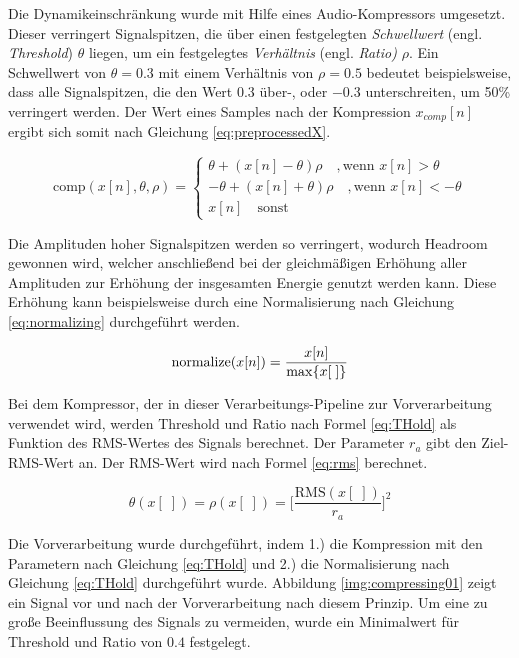 Die Dynamikeinschränkung wurde mit Hilfe eines Audio-Kompressors umgesetzt. Dieser verringert Signalspitzen, die über einen festgelegten \emph{Schwellwert} (engl. \emph{Threshold}) $\theta$ liegen, um ein festgelegtes \emph{Verhältnis} (engl. \emph{Ratio)} $\rho$. Ein Schwellwert von $\theta = 0.3$ mit einem Verhältnis von $\rho = 0.5$ bedeutet beispielsweise, dass alle Signalspitzen, die den Wert 0.3 über-, oder $-0.3$ unterschreiten, um 50\% verringert werden. Der Wert eines Samples nach der Kompression $x_{comp}[n]$ ergibt sich somit nach Gleichung \ref{eq:preprocessedX}.

\begin{equation}
\text{comp}(x[n], \theta, \rho) =
\begin{cases}
\theta + (x[n] - \theta) \rho \quad , \text{wenn } x[n] > \theta \\
-\theta + (x[n] + \theta) \rho \quad, \text{wenn } x[n] < -\theta \\
x[n] \quad \text{sonst}
\end{cases}
\label{eq:preprocessedX}
\end{equation}

Die Amplituden hoher Signalspitzen werden so verringert, wodurch Headroom gewonnen wird, welcher anschließend bei der gleichmäßigen Erhöhung aller Amplituden zur Erhöhung der insgesamten Energie genutzt werden kann. Diese Erhöhung kann beispielsweise durch eine Normalisierung nach Gleichung \ref{eq:normalizing} durchgeführt werden.

\begin{equation}
\text{normalize}(x[n]) = \frac{x[n]}{\operatorname*{max}\{x[\;]\}}
\label{eq:normalizing}
\end{equation}

Bei dem Kompressor, der in dieser Verarbeitungs-Pipeline zur Vorverarbeitung verwendet wird, werden Threshold und Ratio nach Formel \ref{eq:THold} als Funktion des RMS-Wertes des Signals berechnet. Der Parameter $r_a$ gibt den Ziel-RMS-Wert an. Der RMS-Wert wird nach Formel \ref{eq:rms} berechnet.

\begin{equation}
\theta(x[\;]) = \rho(x[\;])  = \bigg[\frac{\text{RMS}(x[\;])}{r_a}\bigg]^{2}
\label{eq:THold}
\end{equation}

Die Vorverarbeitung wurde durchgeführt, indem 1.) die Kompression mit den Parametern nach Gleichung \ref{eq:THold} und 2.) die Normalisierung nach Gleichung \ref{eq:THold} durchgeführt wurde. Abbildung \ref{img:compressing01} zeigt ein Signal vor und nach der Vorverarbeitung nach diesem Prinzip. Um eine zu große Beeinflussung des Signals zu vermeiden, wurde ein Minimalwert für Threshold und Ratio von $0.4$ festgelegt.

